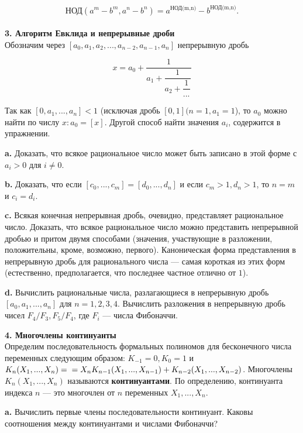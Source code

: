 \[
\text{НОД}(a^m-b^m,a^n-b^n)=a^{\text{НОД(m,n)}}-b^{\text{НОД(m,n)}}.
\]
\\

\noindent \textbf{3. Алгоритм Евклида и непрерывные дроби}
\\

Обозначим через $[a_0,a_1,a_2,...,a_{n-2},a_{n-1},a_{n}]$ непрерывную дробь

\[
x = a_0+\dfrac{1}{a_1+\dfrac{1}{a_2+\dfrac{1}{...}}}
\]

\noindent Так как $[0,a_1,...,a_n] < 1$ (исключая дробь $[0,1] (n=1,a_1=1$), то $a_0$
можно найти по числу $x: a_0=[x]$. Другой способ найти значения $a_i$,
содержится в упражнении.

\pagebreak

\textbf{a.} Доказать, что всякое рациональное число может быть записано
в этой форме с $a_i>0$ для $i \ne 0$.

\textbf{b.} Доказать, что если $[c_0,...,c_m]=[d_0,...,d_n]$ и если $c_m>1,d_n>1$, то $n=m$ и $c_i=d_i$.

\textbf{c.} Всякая конечная непрерывная дробь, очевидно, представляет 
рациональное число. Доказать, что всякое рациональное число можно
представить непрерывной дробью и притом двумя способами 
(значения, участвующие в разложении, положительны, кроме, возможно, 
первого). Каноническая форма представления в непрерывную дробь для
рационального числа — самая короткая из этих форм (естественно,
предполагается, что последнее частное отлично от $1$).

\textbf{d.} Вычислить рациональные числа, разлагающиеся в непрерывную
дробь $[a_0,a_1,...,a_n]$ для $n=1,2,3,4$. Вычислить разложения в 
непрерывную дробь чисел $F_4/F_3,F_5/F_4$, где $F_i$ — числа Фибоначчи.
\\

\restoretop
{}

\noindent \textbf{4. Многочлены континуанты}
\\

Определим последовательность формальных полиномов для 
бесконечного числа переменных следующим образом: $K_{-1} = 0, K_0 = 1$ и
$K_n(X_1,...,X_n)= \\ =X_nK_{n-1}(X_1,...,X_{n-1})+K_{n-2}(X_1,...,X_{n-2})$. Многочлены $K_n(X_1,...,X_n)$ называются \textbf{континуантами}. По определению, континуанта индекса $n$ — это многочлен от $n$ переменных $X_1,...,X_n$.

\textbf{a.} Вычислить первые члены последовательности континуант. Каковы соотношения между континуантами и числами Фибоначчи?

